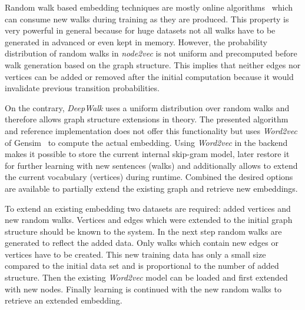 \documentclass[sigconf]{acmart}
\begin{document}
 

Random walk based embedding techniques are mostly online algorithms~\cite{perozzi2014deepwalk}\cite{grover2016node2vec} which can consume new walks during training as they are produced. This property is very powerful in general because for huge datasets not all walks have to be generated in advanced or even kept in memory. However, the probability distribution of random walks in \emph{node2vec} is not uniform and precomputed before walk generation based on the graph structure. This implies that neither edges nor vertices can be added or removed after the initial computation because it would invalidate previous transition probabilities.

On the contrary, \emph{DeepWalk} uses a uniform distribution over random walks and therefore allows graph structure extensions in theory. The presented algorithm and reference implementation does not offer this functionality but uses \emph{Word2vec} of Gensim~\cite{rehurek_lrec} to compute the actual embedding. Using \emph{Word2vec} in the backend makes it possible to store the current internal skip-gram model, later restore it for further learning with new sentences (walks) and additionally allows to extend the current vocabulary (vertices) during runtime. Combined the desired options are available to partially extend the existing graph and retrieve new embeddings.

To extend an existing embedding two datasets are required: added vertices and new random walks. Vertices and edges which were extended to the initial graph structure should be known to the system. In the next step random walks are generated to reflect the added data. Only walks which contain new edges or vertices have to be created. This new training data has only a small size compared to the initial data set and is proportional to the number of added structure. Then the existing \emph{Word2vec} model can be loaded and first extended with new nodes. Finally learning is continued with the new random walks to retrieve an extended embedding. \\
\end{document}
